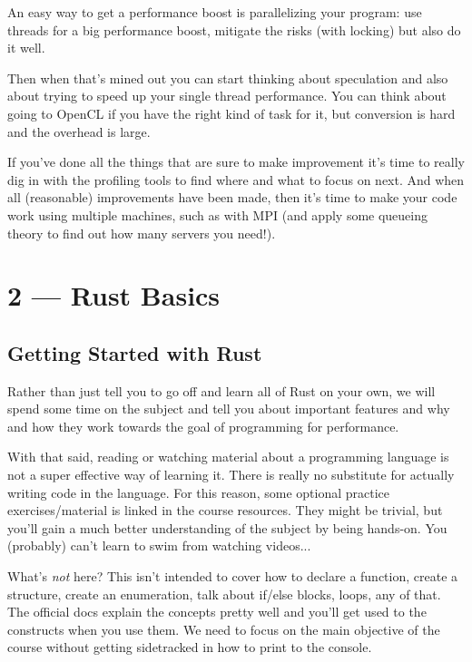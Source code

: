 \documentclass[a4paper]{report}
\begin{document}
An easy way to get a performance boost is parallelizing your program: use threads for a big performance boost, mitigate the risks (with locking) but also do it well. 

Then when that's mined out you can start thinking about speculation and also about trying to speed up your single thread performance. You can think about going to OpenCL if you have the right kind of task for it, but conversion is hard and the overhead is large. 

If you've done all the things that are sure to make improvement it's time to really dig in with the profiling tools to find where and what to focus on next. And when all (reasonable) improvements have been made, then it's time to make your code work using multiple machines, such as with MPI (and apply some queueing theory to find out how many servers you need!).









\chapter*{2 --- Rust Basics}


\section*{Getting Started with Rust}
Rather than just tell you to go off and learn all of Rust on your own, we will spend some time on the subject and tell you about important features and why and how they work towards the goal of programming for performance.

With that said, reading or watching material about a programming language is not a super effective way of learning it. There is really no substitute for actually writing code in the language. For this reason, some optional practice exercises/material is linked in the course resources. They might be trivial, but you'll gain a much better understanding of the subject by being hands-on. You (probably) can't learn to swim from watching videos...

What's \textit{not} here? This isn't intended to cover how to declare a function, create a structure, create an enumeration, talk about if/else blocks, loops, any of that. The official docs explain the concepts pretty well and you'll get used to the constructs when you use them. We need to focus on the main objective of the course without getting sidetracked in how to print to the console. 
\end{document}

